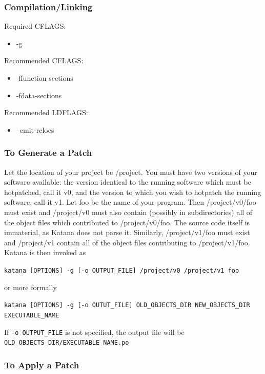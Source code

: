 \documentclass[11pt]{article}
\begin{document}
\subsubsection{Compilation/Linking}
\label{sec-3.5.3}

    Required CFLAGS:
\begin{itemize}
\item -g
\end{itemize}
    Recommended CFLAGS:
\begin{itemize}
\item -ffunction-sections
\item -fdata-sections
\end{itemize}
    Recommended LDFLAGS:
\begin{itemize}
\item --emit-relocs
\end{itemize}
\subsubsection{To Generate a Patch}
\label{sec-3.5.4}

    Let the location of your project be /project. You must have two
    versions of your software available: the version identical to the
    running software which must be hotpatched, call it v0, and the
    version to which you wish to hotpatch the running software, call it
    v1. Let foo be the name of your program. Then /project/v0/foo must
    exist and /project/v0 must also contain (possibly in
    subdirectories) all of the object files which contributed to
    /project/v0/foo. The source code itself is immaterial, as Katana
    does not parse it. Similarly, /project/v1/foo must exist and
    /project/v1 contain all of the object files contributing to
    /project/v1/foo. Katana is then invoked as

    \texttt{katana [OPTIONS] -g [-o OUTPUT\_FILE] /project/v0 /project/v1 foo}

    or more formally

    \texttt{katana [OPTIONS] -g [-o OUTUT\_FILE] OLD\_OBJECTS\_DIR NEW\_OBJECTS\_DIR EXECUTABLE\_NAME}

    If \texttt{-o OUTPUT\_FILE} is not specified, the output file will be \texttt{OLD\_OBJECTS\_DIR/EXECUTABLE\_NAME.po}
\subsubsection{To Apply a Patch}
\label{sec-3.5.5}
\end{document}
